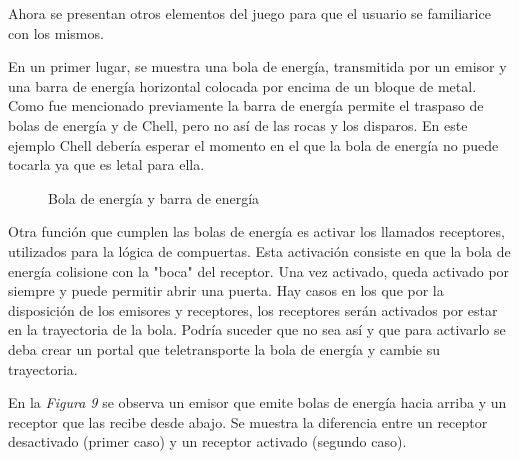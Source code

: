 \documentclass[a4paper]{article}
\begin{document}
Ahora se presentan otros elementos del juego para que el usuario se familiarice con los mismos. 

En un primer lugar, se muestra una bola de energía, transmitida por un emisor y una barra de energía horizontal colocada por encima de un bloque de metal. Como fue mencionado previamente la barra de energía permite el traspaso de bolas de energía y de Chell, pero no así de las rocas y los disparos. En este ejemplo Chell debería esperar el momento en el que la bola de energía no puede tocarla ya que es letal para ella.

\begin{figure}[!h]
	\caption{Bola de energía y barra de energía}
	\label{fig:diagrama8}
\end{figure}

Otra función que cumplen las bolas de energía es activar los llamados receptores, utilizados para la lógica de compuertas. Esta activación consiste en que la bola de energía colisione con la "boca" del receptor. Una vez activado, queda activado por siempre y puede permitir abrir una puerta. Hay casos en los que por la disposición de los emisores y receptores, los receptores serán activados por estar en la trayectoria de la bola. Podría suceder que no sea así y que para activarlo se deba crear un portal que teletransporte la bola de energía y cambie su trayectoria.

En la \textit{Figura 9} se observa un emisor que emite bolas de energía hacia arriba y un receptor que las recibe desde abajo. Se muestra la diferencia entre un receptor desactivado (primer caso) y un receptor activado (segundo caso).
\end{document}
